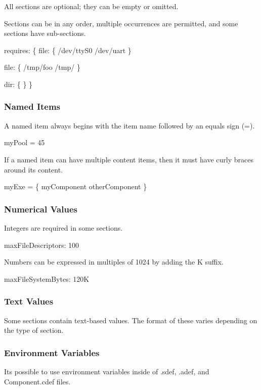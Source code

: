 All sections are optional; they can be empty or omitted.

Sections can be in any order, multiple occurrences are permitted, and some sections have sub-\/sections.


\begin{DoxyCode}
requires:
\{
    file:
    \{
        /dev/ttyS0  /dev/uart
    \}

    file:
    \{
        /tmp/foo  /tmp/
    \}

    dir:
    \{
    \}
\}
\end{DoxyCode}
\hypertarget{def_files_format_defFileFormatNamedItems}{}\subsubsection{Named Items}\label{def_files_format_defFileFormatNamedItems}
A named item always begins with the item name followed by an equals sign (\textquotesingle{}=\textquotesingle{}).


\begin{DoxyCode}
myPool = 45
\end{DoxyCode}


If a named item can have multiple content items, then it must have curly braces around its content.


\begin{DoxyCode}
myExe = \{ myComponent otherComponent \}
\end{DoxyCode}
\hypertarget{def_files_format_defFileFormatNumberValues}{}\subsubsection{Numerical Values}\label{def_files_format_defFileFormatNumberValues}
Integers are required in some sections.


\begin{DoxyCode}
maxFileDescriptors: 100
\end{DoxyCode}


Numbers can be expressed in multiples of 1024 by adding the \textquotesingle{}K\textquotesingle{} suffix.


\begin{DoxyCode}
maxFileSystemBytes: 120K
\end{DoxyCode}
\hypertarget{def_files_format_defFileFormatTextValues}{}\subsubsection{Text Values}\label{def_files_format_defFileFormatTextValues}
Some sections contain text-\/based values. The format of these varies depending on the type of section.\hypertarget{def_files_format_defFileFormatUsingEnvVarsIn}{}\subsubsection{Environment Variables}\label{def_files_format_defFileFormatUsingEnvVarsIn}
It\textquotesingle{}s possible to use environment variables inside of {\ttfamily .sdef}, {\ttfamily .adef}, and {\ttfamily Component.\+cdef} files.

